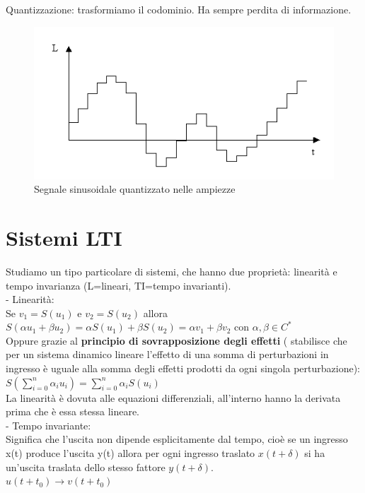 \pagebreak
Quantizzazione: trasformiamo il codominio. Ha sempre perdita di informazione.\\

\begin{figure}[h]
	\centering
	\includegraphics[width=0.7\linewidth]{immagini/quantizzato}
	\caption{ Segnale sinusoidale quantizzato nelle ampiezze}
	\label{fig:quantizzato}
\end{figure}

\section{Sistemi LTI}
Studiamo un tipo particolare di sistemi, che hanno due proprietà: linearità e tempo invarianza (L=lineari, TI=tempo invarianti).\\
- Linearità:\\
Se $ v_{1}=S(u_{1}) $ e $ v_{2}=S(u_{2})  $ 
allora $ S(\alpha u_{1} + \beta u_{2}) 
= \alpha S(u_{1}) + \beta S(u_{2})
= \alpha v_{1} + \beta v_{2} $ con $ \alpha , \beta \in C^{*} $ \\
Oppure grazie al \textbf{principio di sovrapposizione degli effetti} ( stabilisce che per un sistema dinamico lineare l'effetto di una somma di perturbazioni in ingresso è uguale alla somma degli effetti prodotti da ogni singola perturbazione): \\
$ S( \sum_{i=0}^n \alpha_i u_i ) 
=  \sum_{i=0}^n \alpha_i S( u_i )
$ \\
La linearità è dovuta alle equazioni differenziali, all'interno hanno la derivata prima che è essa stessa lineare.\\
- Tempo invariante:\\
 Significa che l'uscita non dipende esplicitamente dal tempo, cioè se un ingresso x(t) produce l'uscita y(t) allora per ogni ingresso traslato $x(t+ \delta )$ si ha un'uscita traslata dello stesso fattore $y(t+ \delta )$.\\
 
 $u(t+ t_0 ) \rightarrow v(t+ t_0 )$
 
